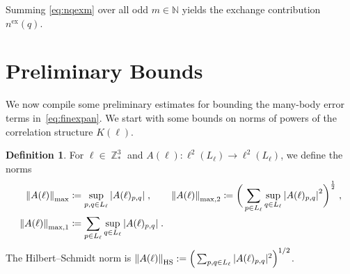 \documentclass[12pt,a4paper]{article}
\numberwithin{equation}{section}
\newcommand{\1}{\mathbb{I}}
\newcommand{\ex}{\mathrm{ex}}
\newcommand{\HS}{\mathrm{HS}}
\newcommand{\Nbb}{\mathbb{N}}
\DeclareMathOperator{\Z}{\mathbb{Z}}
\newcommand{\half}{\frac{1}{2}}
\theoremstyle{plain}
\theoremstyle{definition}
\newtheorem{definition}[theorem]{Definition}
\theoremstyle{remark}
\theoremstyle{plain}
\theoremstyle{definition}
\theoremstyle{remark}
\begin{document}
Summing \eqref{eq:nqexm} over all odd $m \in \Nbb$ yields the exchange contribution $ n^{\ex}(q) $.






\section{Preliminary Bounds}
\label{sec:prelim_bounds}

We now compile some preliminary estimates for bounding the many-body error terms in~\eqref{eq:finexpan}. We start with some bounds on norms of powers of the correlation structure $ K(\ell) $.

\begin{definition}
For $ \ell \in \Z^3_*$ and $A(\ell) : \ell^2(L_\ell) \to \ell^2(L_\ell)$, we define the norms
\begin{equation}
\begin{aligned}
	\norm{A(\ell)}_{\max}
	&\coloneq \sup\limits_{p,q \in L_\ell}\abs{A(\ell)_{p,q}} \;, \qquad
	\norm{A(\ell)}_{\max,2}
	\coloneq \bigg(\sum_{p \in L_\ell}
	\sup\limits_{q \in L_\ell}
	\abs{A(\ell)_{p,q}}^2\bigg)^\half \;, \\
	\norm{A(\ell)}_{\mathrm{max,1}}
	&\coloneq \sum_{p \in L_\ell}
	\sup\limits_{q \in L_\ell}
	\abs{A(\ell)_{p,q}} \;.
\end{aligned}
\end{equation}
The Hilbert--Schmidt norm is $ \norm{A(\ell)}_{\HS} := \Big( \sum_{p,q \in L_\ell} |A(\ell)_{p,q}|^2 \Big)^{1/2} $.
\end{definition}
\end{document}
